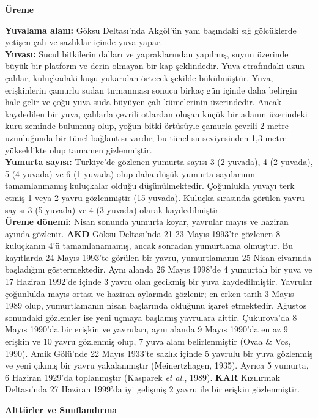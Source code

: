 \documentclass[
  a4paper,
  DIV=11,
  numbers=noendperiod]{scrreprt}
\begin{document}
\textbf{Üreme}

\textbf{Yuvalama alanı:} Göksu Deltası'nda Akgöl'ün yanı başındaki sığ
gölcüklerde yetişen çalı ve sazlıklar içinde yuva yapar.\\
\textbf{Yuvası:} Sucul bitkilerin dalları ve yapraklarından yapılmış,
suyun üzerinde büyük bir platform ve derin olmayan bir kap şeklindedir.
Yuva etrafındaki uzun çalılar, kuluçkadaki kuşu yukarıdan örtecek
şekilde bükülmüştür. Yuva, erişkinlerin çamurlu sudan tırmanması sonucu
birkaç gün içinde daha belirgin hale gelir ve çoğu yuva suda büyüyen
çalı kümelerinin üzerindedir. Ancak kaydedilen bir yuva, çalılarla
çevrili otlardan oluşan küçük bir adanın üzerindeki kuru zeminde
bulunmuş olup, yoğun bitki örtüsüyle çamurla çevrili 2 metre uzunluğunda
bir tünel bağlantısı vardır; bu tünel su seviyesinden 1,3 metre
yükseklikte olup tamamen gizlenmiştir.\\
\textbf{Yumurta sayısı:} Türkiye'de gözlenen yumurta sayısı 3 (2
yuvada), 4 (2 yuvada), 5 (4 yuvada) ve 6 (1 yuvada) olup daha düşük
yumurta sayılarının tamamlanmamış kuluçkalar olduğu düşünülmektedir.
Çoğunlukla yuvayı terk etmiş 1 veya 2 yavru gözlenmiştir (15 yuvada).
Kuluçka sırasında görülen yavru sayısı 3 (5 yuvada) ve 4 (3 yuvada)
olarak kaydedilmiştir.\\
\textbf{Üreme dönemi:} Nisan sonunda yumurta koyar, yavrular mayıs ve
haziran ayında gözlenir. \textbf{AKD} Göksu Deltası'nda 21-23 Mayıs
1993'te gözlenen 8 kuluçkanın 4'ü tamamlanamamış, ancak sonradan
yumurtlama olmuştur. Bu kayıtlarda 24 Mayıs 1993'te görülen bir yavru,
yumurtlamanın 25 Nisan civarında başladığını göstermektedir. Aynı alanda
26 Mayıs 1998'de 4 yumurtalı bir yuva ve 17 Haziran 1992'de içinde 3
yavru olan gecikmiş bir yuva kaydedilmiştir. Yavrular çoğunlukla mayıs
ortası ve haziran aylarında gözlenir; en erken tarih 3 Mayıs 1989 olup,
yumurtlamanın nisan başlarında olduğunu işaret etmektedir. Ağustos
sonundaki gözlemler ise yeni uçmaya başlamış yavrulara aittir.
Çukurova'da 8 Mayıs 1990'da bir erişkin ve yavruları, aynı alanda 9
Mayıs 1990'da en az 9 erişkin ve 10 yavru gözlenmiş olup, 7 yuva alanı
belirlenmiştir (Ovaa \& Vos, 1990). Amik Gölü'nde 22 Mayıs 1933'te
sazlık içinde 5 yavrulu bir yuva gözlenmiş ve yeni çıkmış bir yavru
yakalanmıştır (Meinertzhagen, 1935). Ayrıca 5 yumurta, 6 Haziran 1929'da
toplanmıştır (Kasparek \emph{et al.}, 1989). \textbf{KAR} Kızılırmak
Deltası'nda 27 Haziran 1999'da iyi gelişmiş 2 yavru ile bir erişkin
gözlenmiştir.

\textbf{Alttürler ve Sınıflandırma}
\end{document}
